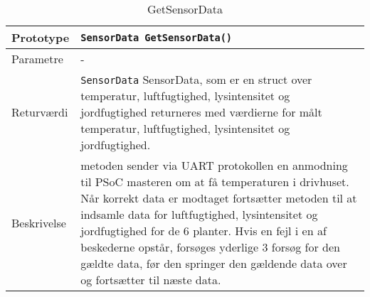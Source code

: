 \begin{table}[h]
\begin{tabularx}{\textwidth}{| >{\raggedright\arraybackslash}p{2.5 cm} | >{\raggedright\arraybackslash}X |} \hline
Prototype & \texttt{SensorData GetSensorData() } \\\hline
Parametre & - \\\hline
Returværdi &\texttt{SensorData} \newline
SensorData, som er en struct over temperatur, luftfugtighed, lysintensitet og jordfugtighed returneres med værdierne for målt temperatur, luftfugtighed, lysintensitet og jordfugtighed. \\\hline
Beskrivelse & metoden sender via UART protokollen en anmodning til PSoC masteren om at få temperaturen i drivhuset. Når korrekt data er modtaget fortsætter metoden til at indsamle data for luftfugtighed, lysintensitet og jordfugtighed for de 6 planter. Hvis en fejl i en af beskederne opstår, forsøges yderlige 3 forsøg for den gældte data, før den springer den gældende data over og fortsætter til næste data.  \\\hline
\end{tabularx}
\caption{GetSensorData}
\label{table:GetSensorData}
\end{table}

